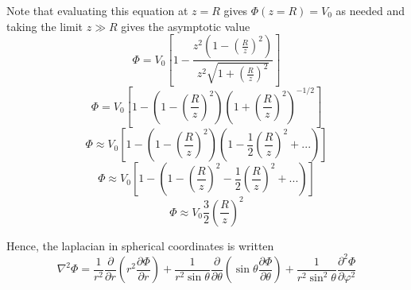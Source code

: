 Note that evaluating this equation at $z=R$ gives $\Phi(z=R)= V_0$ as needed and taking the limit $z \gg R$ gives the asymptotic value 
\begin{equation}
\Phi = V_0 \left[ 1 - \frac{z^2 \left(1- \left( \frac{R}{z} \right)^2 \right) }{z^2 \sqrt{1 + \left( \frac{R}{z} \right)^2} } \right]  
\end{equation}
\begin{equation}
\Phi = V_0 \left[ 1 -  \left(1- \left( \frac{R}{z} \right)^2 \right) \left( 1 + \left( \frac{R}{z} \right)^2 \right)^{-1/2} \right]  
\end{equation}
\begin{equation}
\Phi \approx V_0 \left[ 1 -  \left(1- \left( \frac{R}{z} \right)^2 \right) \left( 1 - \frac{1}{2}\left( \frac{R}{z} \right)^2 + ... \right) \right]  
\end{equation}
\begin{equation}
\Phi \approx V_0 \left[ 1 -  \left(1- \left( \frac{R}{z} \right)^2 - \frac{1}{2}\left( \frac{R}{z} \right)^2 + ... \right) \right]  
\end{equation}
\begin{equation}
\Phi \approx V_0  \frac{3}{2}\left( \frac{R}{z} \right)^2 
\end{equation}




Hence, the laplacian in spherical coordinates is written
\begin{equation}
\nabla^2 \Phi = \frac{1}{r^2}\frac{\partial}{\partial r} \left( r^2 \frac{\partial \Phi}{\partial r} \right) + \frac{1}{r^2 \sin \theta} \frac{\partial}{\partial \theta} \left( \sin \theta \frac{\partial \Phi}{\partial \theta} \right)+ \frac{1}{r^2 \sin^2 \theta} \frac{\partial ^2 \Phi}{\partial \varphi ^2} 
\end{equation}